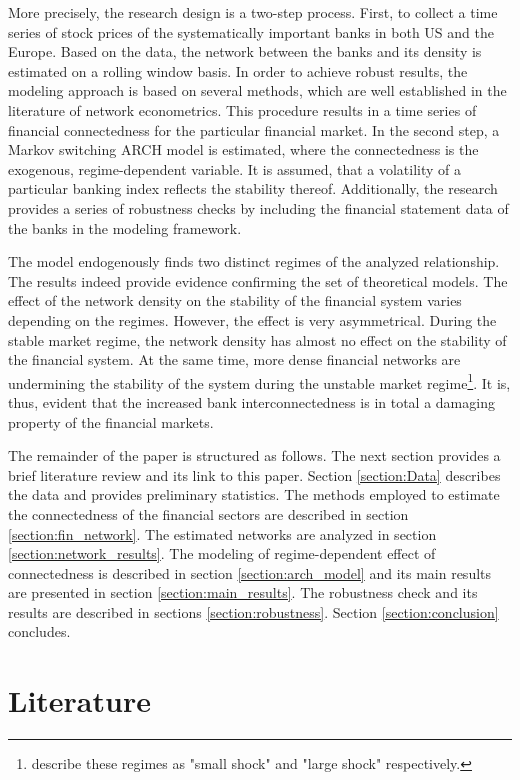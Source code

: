 \documentclass[12pt]{article}
\begin{document}
More precisely, the research design is a two-step process. First, to collect a time series of stock prices of the systematically important banks in both US and the Europe. Based on the data, the network between the banks and its density is estimated on a rolling window basis. In order to achieve robust results, the modeling approach is based on several methods, which are well established in the literature of network econometrics. This procedure results in a time series of financial connectedness for the particular financial market. In the second step, a Markov switching ARCH model is estimated, where the connectedness is the exogenous, regime-dependent variable. It is assumed, that a volatility of a particular banking index reflects the stability thereof. Additionally, the research provides a series of robustness checks by including the financial statement data of the banks in the modeling framework.

The model endogenously finds two distinct regimes of the analyzed relationship. The results indeed provide evidence confirming the set of theoretical models. The effect of the network density on the stability of the financial system varies depending on the regimes. However, the effect is very asymmetrical. During the stable market regime, the network density has almost no effect on the stability of the financial system. At the same time, more dense financial networks are undermining the stability of the system during the unstable market regime\footnote{\cite{acemoglu13} describe these regimes as "small shock" and "large shock" respectively.}. It is, thus, evident that the increased bank interconnectedness is in total a damaging property of the financial markets. 

The remainder of the paper is structured as follows. The next section provides a brief literature review and its link to this paper. Section \ref{section:Data} describes the data and provides preliminary statistics. The methods employed to estimate the connectedness of the financial sectors are described in section \ref{section:fin_network}. The estimated networks are analyzed in section \ref{section:network_results}. The modeling of regime-dependent effect of connectedness is described in section \ref{section:arch_model} and its main results are presented in section \ref{section:main_results}. The robustness check and its results are described in sections \ref{section:robustness}. Section \ref{section:conclusion} concludes.

\section{Literature}\label{section:literature}
\end{document}

